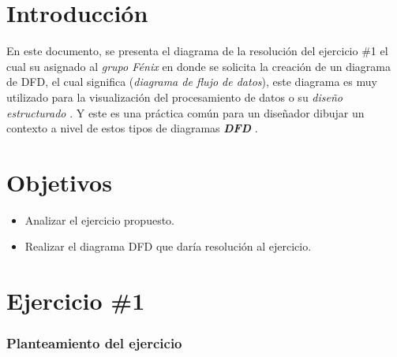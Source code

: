 \documentclass[12pt]{article}
\begin{document}
\newpage
\section{ Introducción }
\vspace{1cm}

\begin{center}
\begin{minipage}{12cm}
En este documento, se presenta el diagrama de la resolución
del ejercicio \#1 el cual su asignado al {\it grupo Fénix }
en donde se solicita la creación de un diagrama de DFD,
el cual significa (\textit {diagrama de flujo de datos}), este
diagrama es muy utilizado para la visualización del procesamiento
de datos o su \textit{ diseño estructurado }. Y este es una práctica
común para un diseñador dibujar un contexto a nivel de estos tipos
de diagramas \textbf{\textit { DFD }}.

\end{minipage}
\end{center}

\newpage
\section{ Objetivos }
\vspace{1cm}

\begin{minipage}{12cm}
\begin{itemize}
  \item Analizar el ejercicio propuesto.
  \item Realizar el diagrama DFD que daría resolución al ejercicio.
\end{itemize}
\end{minipage}


\newpage
\section{Ejercicio \#1}

\subsubsection{Planteamiento del ejercicio}
\end{document}

